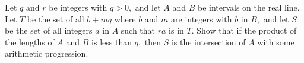 Let $q$ and $r$ be integers with $q>0,$ and let $A$ and $B$ be intervals on the real line. Let $T$ be the set of all $b+mq$ where $b$ and $m$ are integers with $b$ in $B,$ and let $S$ be the set of all integers $a$ in $A$ such that $ra$ is in $T.$ Show that if the product of the lengths of $A$ and $B$ is less than $q,$ then $S$ is the intersection of $A$ with some arithmetic progression.